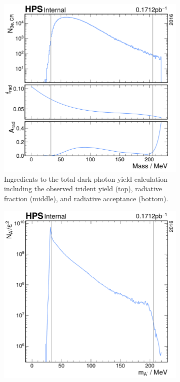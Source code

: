 \begin{figure}
  \centering
  \begin{subfigure}[T]{0.48\textwidth}
    \centering
    \includegraphics[width=\textwidth]{figures/hps/analysis/signal-yield/dark-photon-yield-calc-ingredients.pdf}
    \caption{Ingredients to the total dark photon yield calculation including
    the observed trident yield (top), radiative fraction (middle), and
    radiative acceptance (bottom).}
    \label{fig:dark-photon-yield-calc:ingredients}
  \end{subfigure}
  \begin{subfigure}[T]{0.48\textwidth}
    \centering
    \includegraphics[width=\textwidth]{figures/hps/analysis/signal-yield/dark-photon-yield-calc-result.pdf}

\end{subfigure}
\end{figure}
